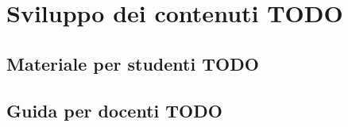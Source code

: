 \documentclass[../../relazione.tex]{subfiles}
\begin{document}
\section{Sviluppo dei contenuti TODO}

\subsection{Materiale per studenti TODO}

\subsection{Guida per docenti TODO}
\end{document}
